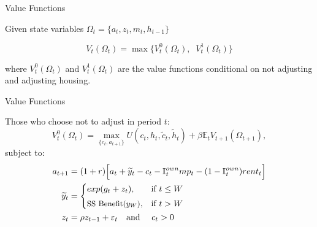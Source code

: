 \documentclass[10pt,english,t,10pt]{beamer}
\begin{document}
\begin{frame}{Value Functions}


Given state variables $\Omega_t = \{ a_t, z_{t}, m_{t}, h_{t-1} \}$

\vfill 

\begin{equation*}
V_t(\Omega_t)=\max \Big\{ V^0_t(\Omega_t), \;\; V^1_t(\Omega_t) \Big\}
\label{allValueF}
\end{equation*}

\vfill 
where $V^0_t(\Omega_t)$ and $V^1_t(\Omega_t)$ are the value functions conditional
on not adjusting and adjusting housing.


\end{frame}

\begin{frame}{Value Functions}

Those who choose not to adjust in period $t$:
\begin{equation}
V^0_t(\Omega_t)= \max_{\{c_t, a_{t+1}\}}
U(c_t, h_t, \tilde{c}_t,\tilde{h}_t) + \beta \mathbb{E}_tV_{t+1}(\Omega_{t+1}),
\label{V0}
\end{equation}
\hspace{53mm} subject to:
\begin{equation}
\begin{split}
a_{t+1} & = (1+r) \Big[  a_t + \widetilde{y}_t  - c_t -\mathbb{I}^{own}_t mp_t -(1-\mathbb{I}^{own}_t) rent_t\Big] \\
\widetilde{y}_t     & =
\begin{cases}
exp(g_t  + z_{t}),  & \text{if } t\leq W \vspace{1mm} \\
\text{\small{SS Benefit($y_W$)}}  ,  & \text{if } t>W
\end{cases} \\
z_t & = \rho z_{t-1} + \varepsilon_t   \quad \text{and } \quad c_t > 0 \\
\end{split}
\label{BC_noadj}
\end{equation}


\end{frame}
\end{document}
